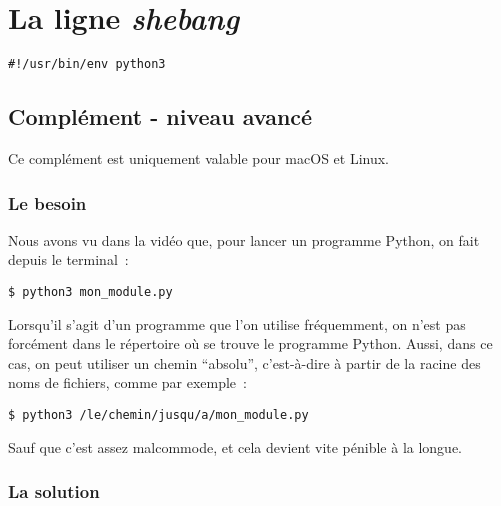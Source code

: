     
    
    
    

    

    \hypertarget{la-ligne-shebang}{%
\section{\texorpdfstring{La ligne
\emph{shebang}}{La ligne shebang}}\label{la-ligne-shebang}}

    \begin{verbatim}
#!/usr/bin/env python3
\end{verbatim}

    \hypertarget{compluxe9ment---niveau-avancuxe9}{%
\subsection{Complément - niveau
avancé}\label{compluxe9ment---niveau-avancuxe9}}

    Ce complément est uniquement valable pour macOS et Linux.

    \hypertarget{le-besoin}{%
\subsubsection{Le besoin}\label{le-besoin}}

    Nous avons vu dans la vidéo que, pour lancer un programme Python, on
fait depuis le terminal~:

    \begin{verbatim}
$ python3 mon_module.py
\end{verbatim}

    Lorsqu'il s'agit d'un programme que l'on utilise fréquemment, on n'est
pas forcément dans le répertoire où se trouve le programme Python.
Aussi, dans ce cas, on peut utiliser un chemin ``absolu'', c'est-à-dire
à partir de la racine des noms de fichiers, comme par exemple~:

    \begin{verbatim}
$ python3 /le/chemin/jusqu/a/mon_module.py
\end{verbatim}

    Sauf que c'est assez malcommode, et cela devient vite pénible à la
longue.

    \hypertarget{la-solution}{%
\subsubsection{La solution}\label{la-solution}}

